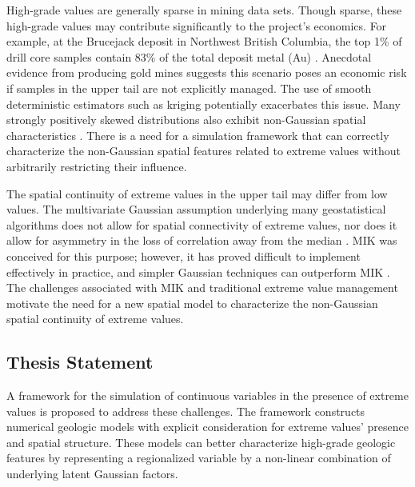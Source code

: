 High-grade values are generally sparse in mining data sets. Though sparse, these high-grade values may contribute significantly to the project's economics. For example, at the Brucejack deposit in Northwest British Columbia, the top 1\% of drill core samples contain 83\% of the total deposit metal (Au) \citep{pretium2020}. Anecdotal evidence from producing gold mines suggests this scenario poses an economic risk if samples in the upper tail are not explicitly managed. The use of smooth deterministic estimators such as kriging potentially exacerbates this issue. Many strongly positively skewed distributions also exhibit non-Gaussian spatial characteristics \citep{journel1989nongaussian}. There is a need for a simulation framework that can correctly characterize the non-Gaussian spatial features related to extreme values without arbitrarily restricting their influence.

The spatial continuity of extreme values in the upper tail may differ from low values. The multivariate Gaussian assumption underlying many geostatistical algorithms does not allow for spatial connectivity of extreme values, nor does it allow for asymmetry in the loss of correlation away from the median \citep{journel1989nongaussian}. \Gls{MIK} \citep{journel1983nonparametric} was conceived for this purpose; however, it has proved difficult to implement effectively in practice, and simpler Gaussian techniques can outperform \gls{MIK} \citep{vincent2021mik}. The challenges associated with \gls{MIK} and traditional extreme value management motivate the need for a new spatial model to characterize the non-Gaussian spatial continuity of extreme values.

\subsection{Thesis Statement}
\label{subsec:01thesis}

A framework for the simulation of continuous variables in the presence of extreme values is proposed to address these challenges. The framework constructs numerical geologic models with explicit consideration for extreme values' presence and spatial structure. These models can better characterize high-grade geologic features by representing a regionalized variable by a non-linear combination of underlying latent Gaussian factors.

